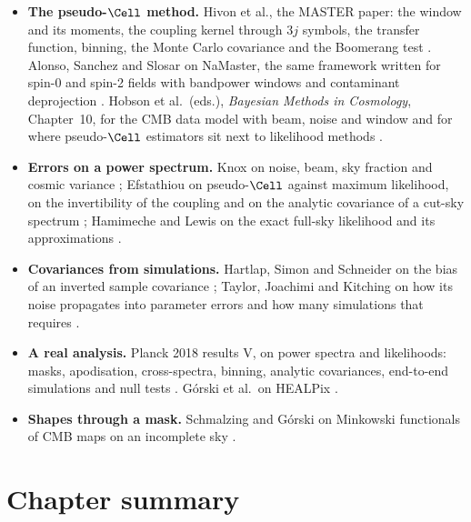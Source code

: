 \begin{itemize}[itemsep=2pt,leftmargin=1.2em]
  \item \textbf{The pseudo-$\Cell$ method.} Hivon et al., the MASTER paper: the window and its moments,
        the coupling kernel through $3j$ symbols, the transfer function, binning, the Monte Carlo covariance
        and the Boomerang test \cite{Hivon2002}. Alonso, Sanchez and Slosar on NaMaster, the same framework
        written for spin-0 and spin-2 fields with bandpower windows and contaminant deprojection
        \cite{Alonso2019}. Hobson et al.\ (eds.), \emph{Bayesian Methods in Cosmology}, Chapter~10, for the
        CMB data model with beam, noise and window and for where pseudo-$\Cell$ estimators sit next to
        likelihood methods .
  \item \textbf{Errors on a power spectrum.} Knox on noise, beam, sky fraction and cosmic variance
        \cite{Knox1995}; Efstathiou on pseudo-$\Cell$ against maximum likelihood, on the invertibility of
        the coupling and on the analytic covariance of a cut-sky spectrum \cite{Efstathiou2004}; Hamimeche
        and Lewis on the exact full-sky likelihood and its approximations \cite{HamimecheLewis2008}.
  \item \textbf{Covariances from simulations.} Hartlap, Simon and Schneider on the bias of an inverted sample
        covariance \cite{Hartlap2007}; Taylor, Joachimi and Kitching on how its noise propagates into
        parameter errors and how many simulations that requires \cite{Taylor2013}.
  \item \textbf{A real analysis.} Planck 2018 results V, on power spectra and likelihoods: masks, apodisation,
        cross-spectra, binning, analytic covariances, end-to-end simulations and null tests
        \cite{Planck2018V}. G\'orski et al.\ on HEALPix \cite{Gorski2005}.
  \item \textbf{Shapes through a mask.} Schmalzing and G\'orski on Minkowski functionals of CMB maps on an
        incomplete sky \cite{SchmalzingGorski1998}.
\end{itemize}

\section*{Chapter summary}
\label{8b:sec:summary}

